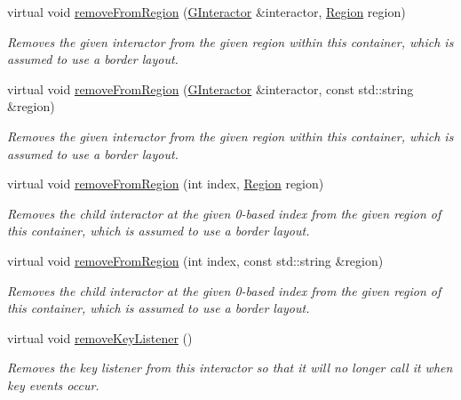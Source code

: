 \begin{DoxyCompactItemize}
virtual void \mbox{\hyperlink{classGContainer_afee7b65f917c4f6a0fdb1c8ea75406a5}{remove\+From\+Region}} (\mbox{\hyperlink{classGInteractor}{G\+Interactor}} \&interactor, \mbox{\hyperlink{classGContainer_a81a01a86de31071a92e6cce0bab9bc4b}{Region}} region)
\begin{DoxyCompactList}\small\item\em Removes the given interactor from the given region within this container, which is assumed to use a border layout. \end{DoxyCompactList}\item 
virtual void \mbox{\hyperlink{classGContainer_af7a055c83c0e0e3f3722596d7111fcbe}{remove\+From\+Region}} (\mbox{\hyperlink{classGInteractor}{G\+Interactor}} \&interactor, const std\+::string \&region)
\begin{DoxyCompactList}\small\item\em Removes the given interactor from the given region within this container, which is assumed to use a border layout. \end{DoxyCompactList}\item 
virtual void \mbox{\hyperlink{classGContainer_a15e3a1d3f3abecc00d68d6df2349f360}{remove\+From\+Region}} (int index, \mbox{\hyperlink{classGContainer_a81a01a86de31071a92e6cce0bab9bc4b}{Region}} region)
\begin{DoxyCompactList}\small\item\em Removes the child interactor at the given 0-\/based index from the given region of this container, which is assumed to use a border layout. \end{DoxyCompactList}\item 
virtual void \mbox{\hyperlink{classGContainer_ac839e32fec6ea6b37f6c6da8aa6ce43b}{remove\+From\+Region}} (int index, const std\+::string \&region)
\begin{DoxyCompactList}\small\item\em Removes the child interactor at the given 0-\/based index from the given region of this container, which is assumed to use a border layout. \end{DoxyCompactList}\item 
virtual void \mbox{\hyperlink{classGInteractor_a43095f41cab3be732b49f29970484b05}{remove\+Key\+Listener}} ()
\begin{DoxyCompactList}\small\item\em Removes the key listener from this interactor so that it will no longer call it when key events occur. \end{DoxyCompactList}\item 

\end{DoxyCompactItemize}
